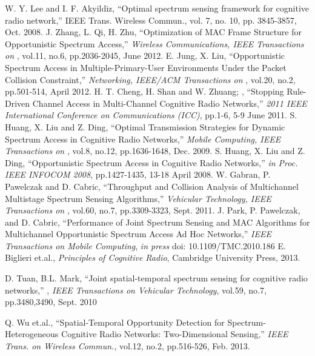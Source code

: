 \begin{thebibliography}{}
 W. Y. Lee and I. F. Akyildiz, ``Optimal spectrum sensing framework for cognitive radio network,'' IEEE Trans. Wireless Commun., vol. 7, no. 10, pp. 3845-3857, Oct. 2008.
 J. Zhang, L. Qi, H. Zhu, ``Optimization of MAC Frame Structure for Opportunistic Spectrum Access,'' \emph{Wireless Communications, IEEE Transactions on }, vol.11, no.6, pp.2036-2045, June 2012.
 E. Jung, X. Liu, ``Opportunistic Spectrum Access in Multiple-Primary-User Environments Under the Packet Collision Constraint,'' \emph{Networking, IEEE/ACM Transactions on }, vol.20, no.2, pp.501-514, April 2012.
 H. T. Cheng, H. Shan and W. Zhuang; , ``Stopping Rule-Driven Channel Access in Multi-Channel Cognitive Radio Networks,'' \emph{2011 IEEE International Conference on Communications (ICC)}, pp.1-6, 5-9 June 2011.
 S. Huang, X. Liu and Z. Ding, ``Optimal Transmission Strategies for Dynamic Spectrum Access in Cognitive Radio Networks,'' \emph{Mobile Computing, IEEE Transactions on }, vol.8, no.12, pp.1636-1648, Dec. 2009.
 S. Huang, X. Liu and Z. Ding, ``Opportunistic Spectrum Access in Cognitive Radio Networks,'' \emph{in Proc. IEEE INFOCOM 2008}, pp.1427-1435, 13-18 April 2008.
 W. Gabran, P. Pawelczak and D. Cabric, ``Throughput and Collision Analysis of Multichannel Multistage Spectrum Sensing Algorithms,'' \emph{Vehicular Technology, IEEE Transactions on }, vol.60, no.7, pp.3309-3323, Sept. 2011.
 J. Park, P. Pawelczak, and D. Cabric, ``Performance of Joint Spectrum Sensing and MAC Algorithms for Multichannel Opportunistic Spectrum Access Ad Hoc Networks,'' \emph{ IEEE Transactions on Mobile Computing}, \textit{in press} doi: 10.1109/TMC.2010.186
 E. Biglieri et.al., \emph{Principles of Cognitive Radio}, Cambridge University Press, 2013.

 D. Tuan, B.L. Mark, ``Joint spatial-temporal spectrum sensing for cognitive radio networks,'' , \emph{IEEE Transactions on Vehicular Technology}, vol.59, no.7, pp.3480,3490, Sept. 2010

 Q. Wu et.al., ``Spatial-Temporal Opportunity Detection for Spectrum-Heterogeneous Cognitive Radio Networks: Two-Dimensional Sensing,'' \emph{IEEE Trans. on Wireless Commun.}, vol.12, no.2, pp.516-526, Feb. 2013.


\end{thebibliography}
